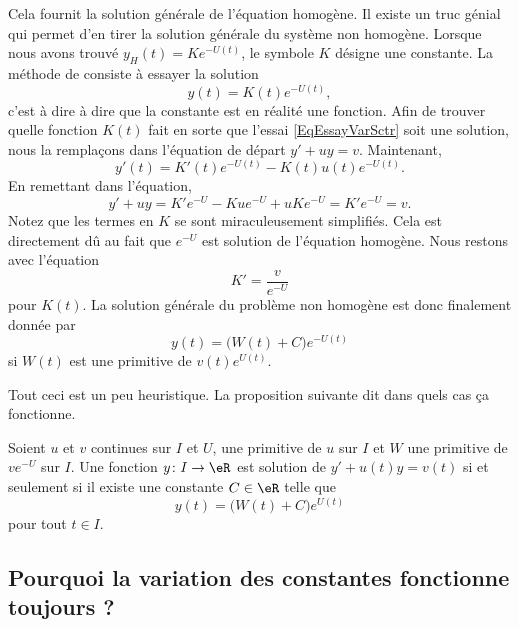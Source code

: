 Cela fournit la solution générale de l'équation homogène. Il existe un truc génial qui permet d'en tirer la solution générale du système non homogène. Lorsque nous avons trouvé $y_H(t)=K e^{-U(t)}$, le symbole $K$ désigne une constante. La méthode de  consiste à essayer la solution
\begin{equation}		\label{EqEssayVarSctr}
	y(t)=K(t) e^{-U(t)},
\end{equation}
c'est à dire à dire que la constante est en réalité une fonction. Afin de trouver quelle fonction $K(t)$ fait en sorte que l'essai \eqref{EqEssayVarSctr} soit une solution, nous la remplaçons dans l'équation de départ $y'+uy=v$. Maintenant,
\begin{equation}
	y'(t)=K'(t) e^{-U(t)}-K(t)u(t) e^{-U(t)}.
\end{equation}
En remettant dans l'équation,
\begin{equation}
	y'+uy=K' e^{-U}-Ku e^{-U}+uK e^{-U}=K' e^{-U}=v.
\end{equation}
Notez que les termes en $K$ se sont miraculeusement simplifiés. Cela est directement dû au fait que $ e^{-U}$ est solution de l'équation homogène. Nous restons avec l'équation
\begin{equation}
	K'=\frac{ v }{  e^{-U} }
\end{equation}
pour $K(t)$. La solution générale du problème non homogène est donc finalement donnée par
\begin{equation}
	y(t)=\big( W(t)+C \big) e^{-U(t)}
\end{equation}
si $W(t)$ est une primitive de $v(t)e^{U(t)}$.

Tout ceci est un peu heuristique. La proposition suivante dit dans quels cas ça fonctionne.
\begin{proposition}
Soient $u$ et $v$ continues sur $I$ et $U$, une primitive de $u$ sur $I$ et $W$ une primitive de $v e^{-U}$ sur $I$. Une fonction $y\colon I\to \eR$ est solution de $y'+u(t)y=v(t)$ si et seulement si il existe une constante $C\in \eR$ telle que
\begin{equation}
	y(t)=\big( W(t)+C \big) e^{U(t)}
\end{equation}
pour tout $t\in I$.
\end{proposition}

\subsection{Pourquoi la variation des constantes fonctionne toujours ?}

